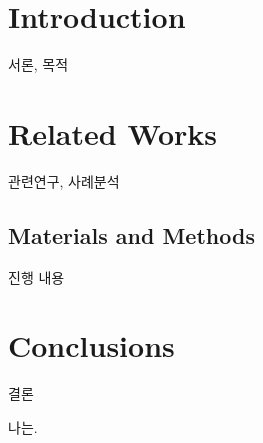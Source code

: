 \section{Introduction}
서론, 목적

\section{Related Works}
관련연구, 사례분석

\subsection{Materials and Methods}
진행 내용

\section{Conclusions}
결론

나는.
